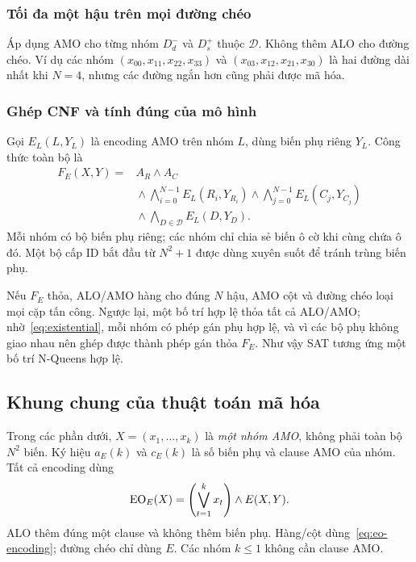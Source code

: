 \subsubsection{Tối đa một hậu trên mọi đường chéo}
Áp dụng AMO cho từng nhóm $D^-_d$ và $D^+_s$ thuộc $\mathcal D$. Không thêm ALO cho đường chéo. Ví dụ các nhóm $(x_{00},x_{11},x_{22},x_{33})$ và $(x_{03},x_{12},x_{21},x_{30})$ là hai đường dài nhất khi $N=4$, nhưng các đường ngắn hơn cũng phải được mã hóa.

\subsubsection{Ghép CNF và tính đúng của mô hình}
Gọi $E_L(L,Y_L)$ là encoding AMO trên nhóm $L$, dùng biến phụ riêng $Y_L$. Công thức toàn bộ là
\begin{equation}
\begin{split}
F_E(X,Y)={}&A_R\land A_C\\
&{}\land\bigwedge_{i=0}^{N-1}E_L(R_i,Y_{R_i})
\land\bigwedge_{j=0}^{N-1}E_L(C_j,Y_{C_j})\\
&{}\land\bigwedge_{D\in\mathcal D}E_L(D,Y_D).
\end{split}
\label{eq:board}
\end{equation}
Mỗi nhóm có bộ biến phụ riêng; các nhóm chỉ chia sẻ biến ô cờ khi cùng chứa ô đó. Một bộ cấp ID bắt đầu từ $N^2+1$ được dùng xuyên suốt để tránh trùng biến phụ.

Nếu $F_E$ thỏa, ALO/AMO hàng cho đúng $N$ hậu, AMO cột và đường chéo loại mọi cặp tấn công. Ngược lại, một bố trí hợp lệ thỏa tất cả ALO/AMO; nhờ~\eqref{eq:existential}, mỗi nhóm có phép gán phụ hợp lệ, và vì các bộ phụ không giao nhau nên ghép được thành phép gán thỏa $F_E$. Như vậy SAT tương ứng một bố trí N-Queens hợp lệ.

\subsection{Khung chung của thuật toán mã hóa}
Trong các phần dưới, $X=(x_1,\ldots,x_k)$ là \emph{một nhóm AMO}, không phải toàn bộ $N^2$ biến. Ký hiệu $a_E(k)$ và $c_E(k)$ là số biến phụ và clause AMO của nhóm. Tất cả encoding dùng
\begin{equation}
\operatorname{EO}_E(X)=\left(\bigvee_{t=1}^{k}x_t\right)\land E(X,Y).
\label{eq:eo-encoding}
\end{equation}
ALO thêm đúng một clause và không thêm biến phụ. Hàng/cột dùng~\eqref{eq:eo-encoding}; đường chéo chỉ dùng $E$. Các nhóm $k\le1$ không cần clause AMO.

